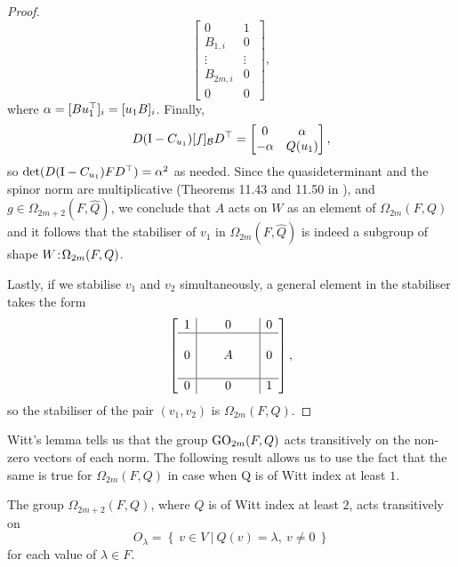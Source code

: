 \begin{proof}
\begin{equation*}
\begin{bmatrix}
	    0 & 1\  \\
	    B_{1,i} & 0\  \\
	    \vdots & \vdots \\
	    B_{2m,i} & 0\  \\
	    0 & 0
	\end{bmatrix},
    \end{equation*}
    where $\alpha = [Bu_1^\top]_i = [u_1B]_i$. Finally, 
    \begin{equation*}
	D(\mathord{\mathrm{I}}-C_{u_1}) [f]_{\mathcal{B}} D^\top = \begin{bmatrix}
	    0 & \alpha \\
	    -\alpha & Q(u_1)
	\end{bmatrix},
    \end{equation*}
    so $\det(D(\mathord{\mathrm{I}}-C_{u_1})FD^\top) = \alpha^2$ as needed. Since the quasideterminant and 
    the spinor norm are multiplicative (Theorems 11.43 and 11.50 in \cite{Taylor}),
    and $g \in \Omega_{2m+2}(F,\hat{Q})$, we conclude that $A$ acts on $W$ as
    an element of $\Omega_{2m}(F,Q)$ and it follows that the stabiliser
    of $v_1$ in $\Omega_{2m}(F,\hat{Q})$ is indeed a subgroup of shape
    $W\mathord{{\;\!{:}\;\!}}\Omega_{2m}(F,Q)$.
    
    Lastly, if we stabilise $v_1$ and $v_2$ simultaneously, a general element in the
    stabiliser takes the form
    \begin{equation*}
	\left[
	    \begin{array}{c|c|c}
		1 & 0 & 0 \\ \hline 
		 & & \\
		0 &\ \ \ \ \ A\ \ \ \ \  & 0 \\ 
		 & & \\ \hline 
		0 & 0 & 1
	    \end{array}
	\right],
    \end{equation*}
    so the stabiliser of the pair $(v_1,v_2)$ is $\Omega_{2m}(F,Q)$. 
\end{proof}

Witt's lemma tells us that the group $\mathrm{GO}_{2m}(F,Q)$ acts transitively 
on the non-zero vectors of each norm. The following result allows us to use the fact
that the same is true for $\Omega_{2m}(F,Q)$ in case when Q is of Witt index at least $1$.

\begin{lemma}
    \label{lemma:A_omega_transitive}
    The group $\Omega_{2m+2}(F,Q)$, where $Q$ is of Witt index at least $2$, 
    acts transitively on
    \begin{equation*}
	O_{\lambda} = \left\{ \  v \in V\ \big|\ Q(v) = \lambda,\ v \neq 0 \ \right\}
    \end{equation*}
    for each value of $\lambda \in F$.
\end{lemma}


